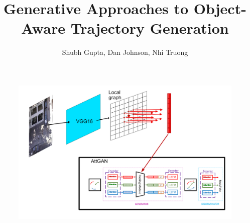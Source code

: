 \documentclass[final]{beamer}
\title{\Huge Generative Approaches to Object-Aware Trajectory Generation}
\author{\LARGE Shubh Gupta, Dan Johnson, Nhi Truong}
\institute{\Large Stanford University, CS 236} %
\begin{document}




\begin{frame}[t] %
\vspace*{10cm}
\begin{figure}[H]
	\centering
	\includegraphics[width=0.7\linewidth]{model}
	\label{fig:}
\end{figure}
\end{frame} %
\end{document}

